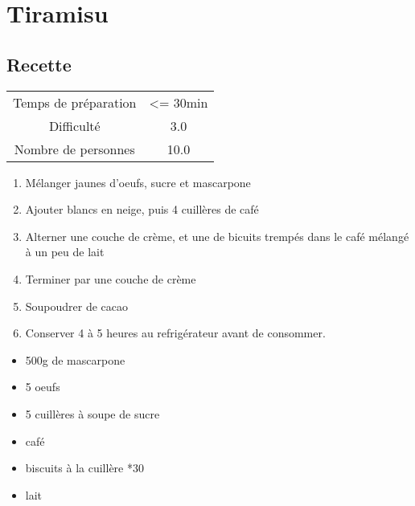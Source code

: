 \newpage
\section{Tiramisu}
    \label{sec:Tiramisu}
    \subsection{Recette}
    \vspace{1cm}


    \begin{center}
        \begin{tabular}{c|c}
            Temps de préparation & <= 30min \\
            Difficulté & 3.0 \\
            Nombre de personnes & 10.0 
        \end{tabular}
    \end{center}{}

    \vspace{1cm}
    \hline
    \vspace{1cm}

    \begin{minipage}{.7\textwidth}
        \begin{enumerate}
            \item Mélanger jaunes d'oeufs, sucre et mascarpone
	    \item Ajouter blancs en neige, puis 4 cuillères de café
	    \item Alterner une couche de crème, et une de bicuits trempés dans le café mélangé à un peu de lait
	    \item Terminer par une couche de crème
	    \item Soupoudrer de cacao
	    \item Conserver 4 à 5 heures au refrigérateur avant de consommer.

        \end{enumerate}
    \end{minipage}
    \begin{minipage}{.3\textwidth}
        \begin{flushleft}
        \begin{itemize}
            \item 500g de mascarpone
	    \item 5 oeufs
	    \item 5 cuillères à soupe de sucre
	    \item café
	    \item biscuits à la cuillère *30
	    \item lait

        \end{itemize}
        \end{flushleft}
    \end{minipage}
    
